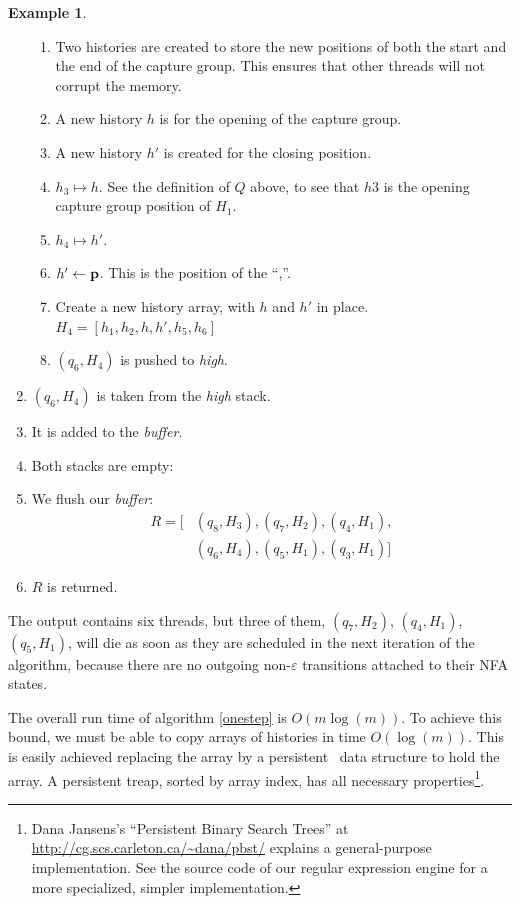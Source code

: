 \documentclass[english]{sigplanconf}
\theoremstyle{definition}
\newtheorem{example}{Example}[section]
\begin{document}
\begin{example}
\begin{enumerate}
\begin{enumerate}
	\item Two histories are created to store the new positions of both the start and the end of the capture group. 
	This ensures that other threads will not corrupt the memory.
	\item A new history $h$ is for the opening of the capture group.
	\item A new history $h'$ is created for the closing position.
	\item $h_3 \mapsto h$. See the definition of $Q$ above, to see that $h3$ is the opening capture group position of $H_1$.
	\item $h_4 \mapsto h'$.
	\item $h'\leftarrow\mathbf{\mathbf{p}}$. This is the position of the ``,''.
	\item Create a new history array, with $h$ and $h'$ in place. 
		$H_4 = [h_1, h_2, h, h', h_5, h_6]$
	\item $(q_6, H_4)$ is pushed to \emph{high}.
\end{enumerate}
\item $(q_6, H_4)$ is taken from the \emph{high} stack.
\item It is added to the \emph{buffer}.
\item Both stacks are empty:
\item We flush our \emph{buffer}: 
\begin{align*}
R=[&(q_8, H_3), (q_7, H_2), (q_4, H_1),\\ &(q_6, H_4), (q_5, H_1), (q_3, H_1)]
\end{align*}
\item $R$ is returned.
\end{enumerate}
\end{example}

The output contains six threads, but three of them,  $(q_7, H_2)$,
$(q_4, H_1)$,  $(q_5, H_1)$, will die as soon as they are scheduled in
the next iteration of the algorithm, because there are no outgoing
non-$\varepsilon$ transitions attached to their NFA states.

The overall run time of algorithm \ref{onestep} is $O(m\log(m))$.
To achieve this bound, we must be able to copy arrays of histories in time $O(\log(m))$.
This is easily achieved replacing the array by a persistent~\cite{Dris89a} 
data structure to hold the array. A persistent treap, sorted by array index,
has all necessary properties\footnote{Dana Jansens's  ``Persistent Binary Search Trees''
at \url{http://cg.scs.carleton.ca/~dana/pbst/} explains a general-purpose implementation.
See the source code of our regular expression engine for a more specialized, simpler implementation.}.
\end{document}
